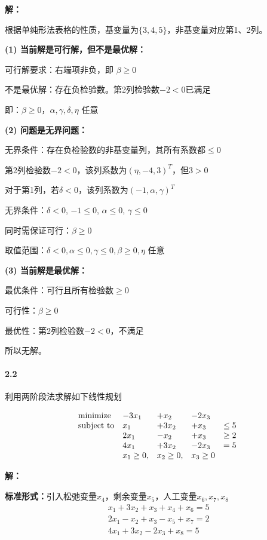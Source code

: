 \documentclass[12pt,a4paper]{article}
\begin{document}
\textbf{解：}

根据单纯形法表格的性质，基变量为$\{3,4,5\}$，非基变量对应第1、2列。

\textbf{(1) 当前解是可行解，但不是最优解：}

可行解要求：右端项非负，即  $\beta \geq 0$

不是最优解：存在负检验数。第2列检验数$-2 < 0$已满足

即：$\beta \geq 0$，$\alpha, \gamma, \delta, \eta$ 任意

\textbf{(2) 问题是无界问题：}

无界条件：存在负检验数的非基变量列，其所有系数都$\leq 0$

第2列检验数$-2 < 0$，该列系数为$(\eta, -4, 3)^T$，但$3 > 0$

对于第1列，若$\delta < 0$，该列系数为$(-1, \alpha, \gamma)^T$

无界条件：$\delta < 0$, $-1 \leq 0$, $\alpha \leq 0$, $\gamma \leq 0$

同时需保证可行：$\beta \geq 0$

取值范围：$\delta < 0, \alpha \leq 0, \gamma \leq 0, \beta \geq 0, \eta \text{ 任意}$

\textbf{(3) 当前解是最优解：}

最优条件：可行且所有检验数$\geq 0$

可行性：$\beta \geq 0$

最优性：第2列检验数$-2 < 0$，不满足

所以无解。

\paragraph{2.2}
利用两阶段法求解如下线性规划

\begin{equation*}
\begin{array}{lllll@{}ll}
\text{minimize}  & -3x_1&+x_2&-2x_3 &\\
\text{subject to}& x_1 &+3x_2  &+x_3  &\leq 5 \\
&2x_1 &-x_2 & +x_3  & \geq 2  \\
&4x_1 &+3x_2 &-2x_3   & =5  \\
&x_1 \geq 0, &x_2 \geq 0, & x_3 \geq 0 &  
\end{array}
\end{equation*}

\textbf{解：}

\textbf{标准形式：}引入松弛变量$x_4$，剩余变量$x_5$，人工变量$x_6, x_7, x_8$
\begin{align*}
& x_1 + 3x_2 + x_3 + x_4 + x_6 = 5 \\
& 2x_1 - x_2 + x_3 - x_5 + x_7 = 2 \\
& 4x_1 + 3x_2 - 2x_3 + x_8 = 5
\end{align*}
\end{document}
